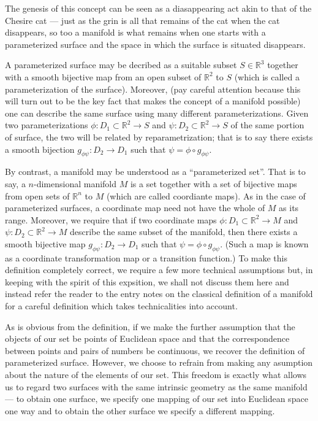\documentclass[12pt]{article}
\begin{document}
The genesis of this concept can be seen as a diasappearing act akin to
that of the Chesire cat --- just as the grin is all that remains of
the cat when the cat disappears, so too a manifold is what remains
when one starts with a parameterized surface and the space in which
the surface is situated disappears.

A parameterized surface may be decribed as a suitable subset $S \in
\mathbb{R}^3$ together with a smooth bijective map from an open subset
of $\mathbb{R}^2$ to $S$ (which is called a parameterization of the
surface).  Moreover, (pay careful attention because this will turn out
to be the key fact that makes the concept of a manifold possible) one
can describe the same surface using many different parameterizations.
Given two parameterizations $\phi \colon D_1 \subset \mathbb{R}^2 \to
S$ and $\psi \colon D_2 \subset \mathbb{R}^2 \to S$ of the same
portion of surface, the two will be related by reparametrization; that
is to say there exists a smooth bijection $g_{\phi \psi} \colon D_2
\to D_1$ such that $\psi = \phi \circ g_{\phi \psi}$.

By contrast, a manifold may be understood as a ``parameterized set''.
That is to say, a $n$-dimensional manifold $M$ is a set together with
a set of bijective maps from open sets of $\mathbb{R}^n$ to $M$ (which
are called coordiante maps).  As in the case of parameterized
surfaces, a coordinate map need not have the whole of $M$ as its
range.  Moreover, we require that if two coordinate maps $\phi \colon
D_1 \subset \mathbb{R}^2 \to M$ and $\psi \colon D_2 \subset
\mathbb{R}^2 \to M$ describe the same subset of the manifold, then
there exists a smooth bijective map $g_{\phi \psi} \colon D_2 \to D_1$
such that $\psi = \phi \circ g_{\phi \psi}$.  (Such a map is known as
a coordinate transformation map or a transition function.)  To make
this definition completely correct, we require a few more technical
assumptions but, in keeping with the spirit of this expsition, we
shall not discuss them here and instead refer the reader to the entry
notes on the classical definition of a manifold for a careful
definition which takes technicalities into account.

As is obvious from the definition, if we make the further assumption
that the objects of our set be points of Euclidean space and that the
correspondence between points and pairs of numbers be continuous, we
recover the definition of parameterized surface.  However, we choose
to refrain from making any asumption about the nature of the elements
of our set.  This freedom is exactly what allows us to regard two
surfaces with the same intrinsic geometry as the same manifold --- to
obtain one surface, we specify one mapping of our set into Euclidean
space one way and to obtain the other surface we specify a different
mapping.
\end{document}
